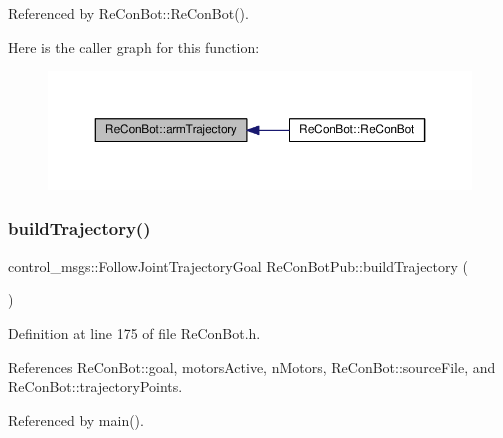 Referenced by Re\+Con\+Bot\+::\+Re\+Con\+Bot().

Here is the caller graph for this function\+:\nopagebreak
\begin{figure}[H]
\begin{center}
\leavevmode
\includegraphics[width=350pt]{d9/d0b/class_re_con_bot_a950f2769ca61ff7b663d86ed2cf19c14_icgraph}
\end{center}
\end{figure}
\mbox{\label{class_re_con_bot_pub_af99f5189cd8e834d7b59f1b106b99345}} 
\subsubsection{\texorpdfstring{build\+Trajectory()}{buildTrajectory()}}
{\footnotesize\ttfamily control\+\_\+msgs\+::\+Follow\+Joint\+Trajectory\+Goal Re\+Con\+Bot\+Pub\+::build\+Trajectory (\begin{DoxyParamCaption}{ }\end{DoxyParamCaption})}



Definition at line 175 of file Re\+Con\+Bot.\+h.



References Re\+Con\+Bot\+::goal, motors\+Active, n\+Motors, Re\+Con\+Bot\+::source\+File, and Re\+Con\+Bot\+::trajectory\+Points.



Referenced by main().


